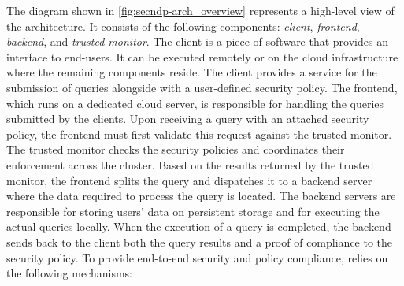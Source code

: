 \fi 
{} %
The diagram shown in \autoref{fig:secndp-arch_overview} represents a high-level view of the \project{} architecture. It consists of the following components: \textit{client}, \textit{frontend}, \textit{backend}, and \textit{trusted monitor}. The client is a piece of software that provides an interface to end-users. It can be executed remotely or on the cloud infrastructure where the remaining components reside. The client provides a service for the submission of queries alongside with a user-defined security policy. The \project{} frontend, which runs on a dedicated cloud server, is responsible for handling the queries submitted by the clients. Upon receiving a query with an attached security policy, the \project{} frontend must first validate this request against the \project{} trusted monitor. The trusted monitor checks the security policies and coordinates their enforcement across the cluster. Based on the results returned by the trusted monitor, the \project{} frontend splits the query and dispatches it to a \project{} backend server where the data required to process the query is located. The backend servers are responsible for storing users' data on persistent storage and for executing the actual queries locally. When the execution of a query is completed, the \project{} backend sends back to the client both the query results and a proof of compliance to the security policy. To provide end-to-end security and policy compliance, \project{} relies on the following mechanisms:
\fi